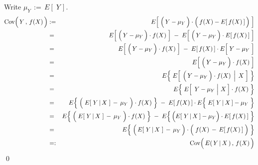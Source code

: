 \proof
Write $\mu_{Y} \,:=\, E\!\left[\;Y\,\right]$.
\begin{eqnarray*}
\Cov\!\left(\,\overset{{\color{white}.}}{Y}\,,\,f(X)\,\right)
&:=&
	E\!\left[\;\left(\,\overset{{\color{white}.}}{Y} - \mu_{Y}\,\right) \cdot \left(\,\overset{{\color{white}.}}{f}(X) - E[\,f(X)\,]\,\right)\;\right]
\\
&=&
	E\!\left[\;\left(\,\overset{{\color{white}.}}{Y} - \mu_{Y}\,\right) \cdot f(X)\;\right]
	\; - \;
	E\!\left[\;\left(\,\overset{{\color{white}.}}{Y} - \mu_{Y}\,\right) \cdot E[\,f(X)\,]\;\right]
\\
&=&
	E\!\left[\;\left(\,\overset{{\color{white}.}}{Y} - \mu_{Y}\,\right) \cdot f(X)\;\right]
	\; - \;
	E[\,f(X)\,] \cdot E\!\left[\;\overset{{\color{white}.}}{Y} - \mu_{Y}\;\right]
\\
&=&
	E\!\left[\;\left(\,\overset{{\color{white}.}}{Y} - \mu_{Y}\,\right) \cdot f(X)\;\right]
\\
&=&
	E\!\left\{\;
		E\!\left[\;\left.\left(\,\overset{{\color{white}.}}{Y} - \mu_{Y}\,\right) \cdot f(X)\;\,\right\vert\;X\;\right]
	\;\right\}
\\
&=&
	E\!\left\{\;
		E\!\left[\,\left.\,\overset{{\color{white}.}}{Y} - \mu_{Y}\;\right\vert\,X\,\right]
		\cdot
		f(X)
	\;\right\}
\\
&=&
	E\!\left\{\;
		\left(\;\overset{{\color{white}.}}{E}\!\left[\;Y\,\vert\,X\;\right] \,-\, \mu_{Y}\;\right)
		\cdot
		f(X)
	\;\right\}
	\; - \;
	E[\,f(X)\,] \cdot E\!\left\{\;\overset{{\color{white}.}}{E}[\;Y\,\vert\,X\,] - \mu_{Y}\;\right\}
\\
&=&
	E\!\left\{\;
		\left(\;\overset{{\color{white}.}}{E}\!\left[\;Y\,\vert\,X\;\right] \,-\, \mu_{Y}\;\right)
		\cdot
		f(X)
	\;\right\}
	\; - \;
	E\!\left\{\,\left(\overset{{\color{white}.}}{E}[\;Y\,\vert\,X\,] - \mu_{Y}\right) \cdot E[\,f(X)\,]\;\right\}
\\
&=&
	E\!\left\{\;
		\left(\,\overset{{\color{white}.}}{E}\!\left[\;Y\,\vert\,X\;\right] \,-\, \mu_{Y}\,\right)
		\cdot
		\left(\;\overset{{\color{white}.}}{f}(X)\,-\,E[\,f(X)\,]\;\right)
	\;\right\}
\\
&=:&
	\Cov\!\left(\,\overset{{\color{white}.}}{E}(\,Y\,\vert\,X\,)\,,\,f(X)\,\right)
\end{eqnarray*}
\qed

